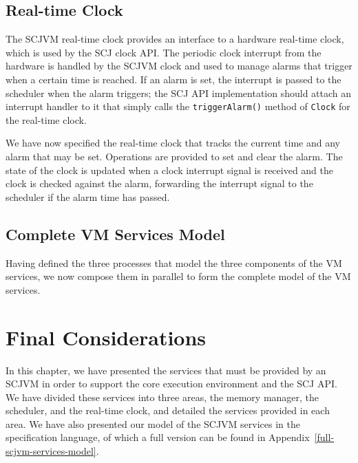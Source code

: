 \subsection{Real-time Clock}
\label{realtime-clock-model-section}

The SCJVM real-time clock provides an interface to a hardware
real-time clock, which is used by the SCJ clock API. 
The periodic clock interrupt from the hardware is handled by the SCJVM
clock and used to manage alarms that trigger when a certain time is
reached. 
If an alarm is set, the interrupt is passed to the scheduler when the
alarm triggers; the SCJ API implementation should attach an interrupt
handler to it that simply calls the \texttt{triggerAlarm()} method of
\texttt{Clock} for the real-time clock. 



We have now specified the real-time clock that tracks the current time
and any alarm that may be set.
Operations are provided to set and clear the alarm.
The state of the clock is updated when a clock interrupt signal is
received and the clock is checked against the alarm, forwarding the
interrupt signal to the scheduler if the alarm time has passed.

\subsection{Complete VM Services Model}
\label{scjvm-services-section}

Having defined the three processes that model the three components of
the VM services, we now compose them in parallel to form the complete
model of the VM services.



\section{Final Considerations}

In this chapter, we have presented the services that must be provided
by an SCJVM in order to support the core execution environment and the
SCJ API.
We have divided these services into three areas, the memory manager,
the scheduler, and the real-time clock, and detailed the services
provided in each area.
We have also presented our model of the SCJVM services in the
\Circus{} specification language, of which a full version can be found
in Appendix~\ref{full-scjvm-services-model}.

